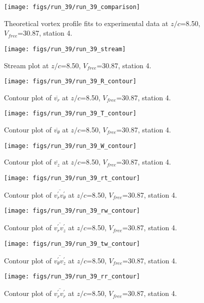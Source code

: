\begin{figure}[H]
\centering
\texttt{[image: figs/run\_39/run\_39\_comparison]}
\caption{Theoretical vortex profile fits to experimental data at $z/c$=8.50, $V_{free}$=30.87, station 4.}
\end{figure}


\begin{figure}[H]
\centering
\texttt{[image: figs/run\_39/run\_39\_stream]}
\caption{Stream plot at $z/c$=8.50, $V_{free}$=30.87, station 4.}
\end{figure}


\begin{figure}[H]
\centering
\texttt{[image: figs/run\_39/run\_39\_R\_contour]}
\caption{Contour plot of $\overline{v_{r}}$ at $z/c$=8.50, $V_{free}$=30.87, station 4.}
\end{figure}


\begin{figure}[H]
\centering
\texttt{[image: figs/run\_39/run\_39\_T\_contour]}
\caption{Contour plot of $\overline{v_{\theta}}$ at $z/c$=8.50, $V_{free}$=30.87, station 4.}
\end{figure}


\begin{figure}[H]
\centering
\texttt{[image: figs/run\_39/run\_39\_W\_contour]}
\caption{Contour plot of $\overline{v_{z}}$ at $z/c$=8.50, $V_{free}$=30.87, station 4.}
\end{figure}


\begin{figure}[H]
\centering
\texttt{[image: figs/run\_39/run\_39\_rt\_contour]}
\caption{Contour plot of $\overline{v_{r}^{\prime} v_{\theta}^{\prime}}$ at $z/c$=8.50, $V_{free}$=30.87, station 4.}
\end{figure}


\begin{figure}[H]
\centering
\texttt{[image: figs/run\_39/run\_39\_rw\_contour]}
\caption{Contour plot of $\overline{v_{r}^{\prime} v_{z}^{\prime}}$ at $z/c$=8.50, $V_{free}$=30.87, station 4.}
\end{figure}


\begin{figure}[H]
\centering
\texttt{[image: figs/run\_39/run\_39\_tw\_contour]}
\caption{Contour plot of $\overline{v_{\theta}^{\prime} v_{z}^{\prime}}$ at $z/c$=8.50, $V_{free}$=30.87, station 4.}
\end{figure}


\begin{figure}[H]
\centering
\texttt{[image: figs/run\_39/run\_39\_rr\_contour]}
\caption{Contour plot of $\overline{v_{r}^{\prime} v_{r}^{\prime}}$ at $z/c$=8.50, $V_{free}$=30.87, station 4.}
\end{figure}


